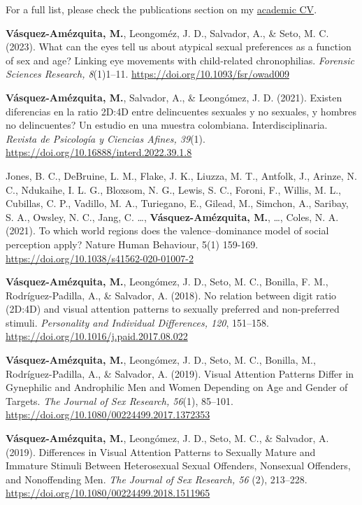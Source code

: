\documentclass[11pt,a4paper,]{awesome-cv}
\begin{document}
For a full list, please check the publications section on my
\href{https://jdleongomez.github.io/Mile_CV/CV_eng/MVA_CV_en.pdf}{academic
CV}.

\begingroup
\setlength{\parindent}{-0.5in}
\setlength{\leftskip}{0.5in}

\textbf{Vásquez-Amézquita, M.}, Leongoméz, J. D., Salvador, A., \& Seto,
M. C. (2023). What can the eyes tell us about atypical sexual
preferences as a function of sex and age? Linking eye movements with
child-related chronophilias. \emph{Forensic Sciences Research,
8}(1)1--11. \url{https://doi.org/10.1093/fsr/owad009}

\textbf{Vásquez-Amézquita, M.}, Salvador, A., \& Leongómez, J. D.
(2021). Existen diferencias en la ratio 2D:4D entre delincuentes
sexuales y no sexuales, y hombres no delincuentes? Un estudio en una
muestra colombiana. Interdisciplinaria. \emph{Revista de Psicología y
Ciencias Afines, 39}(1).
\url{https://doi.org/10.16888/interd.2022.39.1.8}

Jones, B. C., DeBruine, L. M., Flake, J. K., Liuzza, M. T., Antfolk, J.,
Arinze, N. C., Ndukaihe, I. L. G., Bloxsom, N. G., Lewis, S. C., Foroni,
F., Willis, M. L., Cubillas, C. P., Vadillo, M. A., Turiegano, E.,
Gilead, M., Simchon, A., Saribay, S. A., Owsley, N. C., Jang, C. \ldots,
\textbf{Vásquez-Amézquita, M.}, \ldots, Coles, N. A. (2021). To which
world regions does the valence--dominance model of social perception
apply? Nature Human Behaviour, 5(1) 159-169.
\url{https://doi.org/10.1038/s41562-020-01007-2}

\textbf{Vásquez-Amézquita, M.}, Leongómez, J. D., Seto, M. C., Bonilla,
F. M., Rodríguez-Padilla, A., \& Salvador, A. (2018). No relation
between digit ratio (2D:4D) and visual attention patterns to sexually
preferred and non-preferred stimuli. \emph{Personality and Individual
Differences, 120}, 151--158.
\url{https://doi.org/10.1016/j.paid.2017.08.022}

\textbf{Vásquez-Amézquita, M.}, Leongómez, J. D., Seto, M. C., Bonilla,
M., Rodríguez-Padilla, A., \& Salvador, A. (2019). Visual Attention
Patterns Differ in Gynephilic and Androphilic Men and Women Depending on
Age and Gender of Targets. \emph{The Journal of Sex Research, 56}(1),
85--101. \url{https://doi.org/10.1080/00224499.2017.1372353}

\textbf{Vásquez-Amézquita, M.}, Leongómez, J. D., Seto, M. C., \&
Salvador, A. (2019). Differences in Visual Attention Patterns to
Sexually Mature and Immature Stimuli Between Heterosexual Sexual
Offenders, Nonsexual Offenders, and Nonoffending Men. \emph{The Journal
of Sex Research, 56} (2), 213--228.
\url{https://doi.org/10.1080/00224499.2018.1511965}
\end{document}
